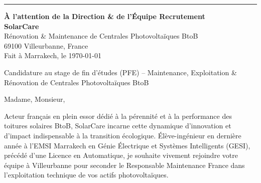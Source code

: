 \documentclass[10pt,a4paper]{altacv}
\makeatletter
\renewcommand{\makecvheader}{%
  \begingroup
    \raggedright\color{emphasis}%
    {\LARGE\bfseries\MakeUppercase{\@name}\par}\vspace{2pt}
    {\normalsize\bfseries\color{accent}\@tagline\par}\vspace{4pt}
    {\footnotesize\color{emphasis}\@personalinfo\par}
  \endgroup\vspace{5pt}
  {\color{heading}\rule{\linewidth}{1.2pt}}\par\vspace{7pt}
}
\makeatother
\begin{document}

\makecvheader

\begin{flushright}
  {\color{emphasis}\textbf{À l'attention de la Direction \& de l'Équipe Recrutement}} \\[2pt]
  \textbf{SolarCare} \\
  Rénovation \& Maintenance de Centrales Photovoltaïques BtoB \\
  69100 Villeurbanne, France \\[6pt]
  Fait à Marrakech, le \today
\end{flushright}
\vspace{4pt}

 Candidature au stage de fin d'études (PFE) -- Maintenance, Exploitation \& Rénovation de Centrales Photovoltaïques BtoB

\vspace{8pt}

\noindent Madame, Monsieur,

\vspace{6pt}

Acteur français en plein essor dédié à la pérennité et à la performance des toitures solaires BtoB, SolarCare incarne cette dynamique d'innovation et d'impact indispensable à la transition écologique. Élève-ingénieur en dernière année à l'EMSI Marrakech en Génie Électrique et Systèmes Intelligents (GESI), précédé d'une Licence en Automatique, je souhaite vivement rejoindre votre équipe à Villeurbanne pour seconder le Responsable Maintenance France dans l'exploitation technique de vos actifs photovoltaïques.
\end{document}
